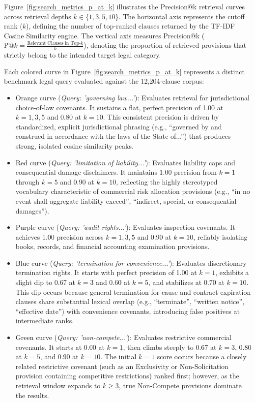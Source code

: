 

Figure~\ref{fig:search_metrics_p_at_k} illustrates the Precision@k retrieval curves across retrieval depths $k \in \{1, 3, 5, 10\}$. The horizontal axis represents the cutoff rank ($k$), defining the number of top-ranked clauses returned by the TF-IDF Cosine Similarity engine. The vertical axis measures Precision@k ($\text{P}@k = \frac{\text{Relevant Clauses in Top-}k}{k}$), denoting the proportion of retrieved provisions that strictly belong to the intended target legal category.

Each colored curve in Figure~\ref{fig:search_metrics_p_at_k} represents a distinct benchmark legal query evaluated against the 12,204-clause corpus:
\begin{itemize}
    \item Orange curve (\textit{Query: 'governing law...'}): Evaluates retrieval for jurisdictional choice-of-law covenants. It sustains a flat, perfect precision of 1.00 at $k=1, 3, 5$ and 0.80 at $k=10$. This consistent precision is driven by standardized, explicit jurisdictional phrasing (e.g., ``governed by and construed in accordance with the laws of the State of...'') that produces strong, isolated cosine similarity peaks.
    \item Red curve (\textit{Query: 'limitation of liability...'}): Evaluates liability caps and consequential damage disclaimers. It maintains 1.00 precision from $k=1$ through $k=5$ and 0.90 at $k=10$, reflecting the highly stereotyped vocabulary characteristic of commercial risk allocation provisions (e.g., ``in no event shall aggregate liability exceed'', ``indirect, special, or consequential damages'').
    \item Purple curve (\textit{Query: 'audit rights...'}): Evaluates inspection covenants. It achieves 1.00 precision across $k=1, 3, 5$ and 0.90 at $k=10$, reliably isolating books, records, and financial accounting examination provisions.
    \item Blue curve (\textit{Query: 'termination for convenience...'}): Evaluates discretionary termination rights. It starts with perfect precision of 1.00 at $k=1$, exhibits a slight dip to 0.67 at $k=3$ and 0.60 at $k=5$, and stabilizes at 0.70 at $k=10$. This dip occurs because general termination-for-cause and contract expiration clauses share substantial lexical overlap (e.g., ``terminate'', ``written notice'', ``effective date'') with convenience covenants, introducing false positives at intermediate ranks.
    \item Green curve (\textit{Query: 'non-compete...'}): Evaluates restrictive commercial covenants. It starts at 0.00 at $k=1$, then climbs steeply to 0.67 at $k=3$, 0.80 at $k=5$, and 0.90 at $k=10$. The initial $k=1$ score occurs because a closely related restrictive covenant (such as an Exclusivity or Non-Solicitation provision containing competitive restrictions) ranked first; however, as the retrieval window expands to $k \ge 3$, true Non-Compete provisions dominate the results.
\end{itemize}

